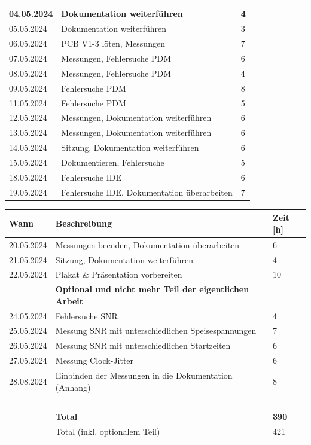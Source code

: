 \documentclass[12pt]{article}
\begin{document}
\begin{table}[H]
\begin{tabular}{|l|p{}|l|}
			04.05.2024 & Dokumentation weiterführen & 4 \\ \hline
			05.05.2024 & Dokumentation weiterführen & 3 \\ \hline
			06.05.2024 & PCB V1-3 löten, Messungen & 7 \\ \hline
			07.05.2024 & Messungen, Fehlersuche PDM & 6 \\ \hline
			08.05.2024 & Messungen, Fehlersuche PDM & 4 \\ \hline
			09.05.2024 & Fehlersuche PDM & 8 \\ \hline
			11.05.2024 & Fehlersuche PDM & 5 \\ \hline
			12.05.2024 & Messungen, Dokumentation weiterführen & 6 \\ \hline
			13.05.2024 & Messungen, Dokumentation weiterführen & 6 \\ \hline
			14.05.2024 & Sitzung, Dokumentation weiterführen & 6 \\ \hline
			15.05.2024 & Dokumentieren, Fehlersuche & 5 \\ \hline
			18.05.2024 & Fehlersuche IDE & 6 \\ \hline
			19.05.2024 & Fehlersuche IDE, Dokumentation überarbeiten & 7 \\ \hline
		\end{tabular}
	\end{table}
	\begin{table}[H]
		\centering
		\begin{tabular}{|l|p{}|l|}
			\hline
			\textbf{Wann} & \textbf{Beschreibung} & \textbf{Zeit [h]} \\ \hline
			20.05.2024 & Messungen beenden, Dokumentation überarbeiten & 6 \\ \hline
			21.05.2024 & Sitzung, Dokumentation weiterführen & 4 \\ \hline
			22.05.2024 & Plakat \& Präsentation vorbereiten & 10 \\ \hline
			~ & \textbf{Optional und nicht mehr Teil der eigentlichen Arbeit} & ~ \\ \hline
			24.05.2024 & Fehlersuche SNR & 4 \\ \hline
			25.05.2024 & Messung SNR mit unterschiedlichen Speisespannungen & 7 \\ \hline
			26.05.2024 & Messung SNR mit unterschiedlichen Startzeiten & 6 \\ \hline
			27.05.2024 & Messung Clock-Jitter & 6 \\ \hline
			28.08.2024 & Einbinden der Messungen in die Dokumentation (Anhang) & 8 \\ \hline
			~ & ~ & ~ \\ \hline
			~ & \textbf{Total} & \textbf{390} \\ \hline
			~ & Total (inkl. optionalem Teil) & 421 \\ \hline
		\end{tabular}
	\end{table}
	
\end{document}
